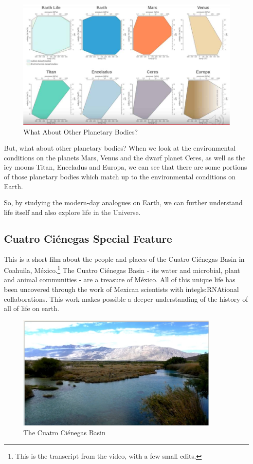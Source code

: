 \documentclass[]{article}
\begin{document}
\begin{figure}[H]
	\caption{What About Other Planetary Bodies?}\label{fig:WhatAboutOtherPlanetaryBodies}
	\includegraphics[width=\textwidth]{WhatAboutOtherPlanetaryBodies}
\end{figure}
But, what about other planetary bodies?
When we look at
the environmental conditions
on the planets Mars, Venus
and the dwarf planet Ceres,
as well as the icy moons Titan,
Enceladus and Europa,
we can see that there are some portions
of those planetary bodies
which match up to the environmental
conditions on Earth.

So, by studying the modern-day analogues
on Earth,
we can further understand life itself
and also explore life in the Universe.


\subsection{Cuatro Ci\'enegas Special Feature}

This is a short film about the people and places of the Cuatro Ci\'enegas Basin in Coahuila, M\'exico.\footnote{This is the transcript from the video, with a few small edits.} The Cuatro Ci\'enegas Basin - its water and microbial, plant and animal communities -
are a treasure of M\'exico. All of this unique life has been uncovered through the work of Mexican scientists with inte\gls{gls:RNA}tional collaborations. This work makes possible a deeper understanding of the history of all of life on earth.

\begin{figure}[H]
	\caption{The Cuatro Ci\'enegas Basin} 
	\includegraphics[width=0.9\textwidth]{CuatroCienegas1}
\end{figure}
\end{document}
